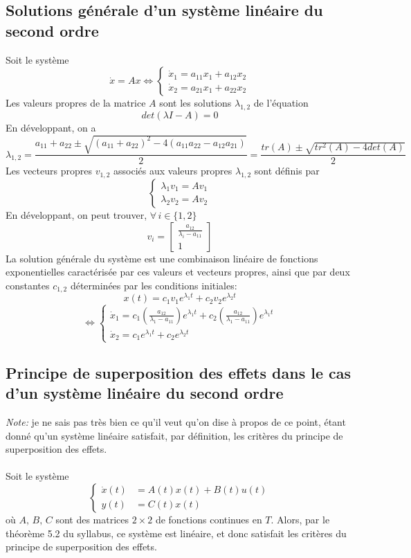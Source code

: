 \documentclass[a4paper]{article}
\begin{document}
\subsection{Solutions générale d'un système linéaire du second ordre}
Soit le système
\[\dot x=Ax\Leftrightarrow
	\begin{cases}
		\dot x_1 = a_{11}x_1 + a_{12}x_2\\
		\dot x_2 = a_{21}x_1 + a_{22}x_2
	\end{cases}
\]
Les valeurs propres de la matrice \(A\) sont les solutions \(\lambda_{1,2}\) de l'équation
\[det(\lambda I-A)=0\]
En développant, on a
\[\lambda_{1,2} = \frac{a_{11}+a_{22} \pm \sqrt{(a_{11}+a_{22})^2 - 4(a_{11}a_{22} - a_{12}a_{21})}}{2}
	=\frac{tr(A)\pm\sqrt{tr^2(A) - 4det(A)}}{2}
\]
Les vecteurs propres \(v_{1,2}\) associés aux valeurs propres \(\lambda_{1,2}\) sont définis par
\[\begin{cases}
	\lambda_1 v_1=Av_1\\
	\lambda_2 v_2=Av_2
\end{cases}\]
En développant, on peut trouver, \(\forall\, i\in\{1, 2\}\)
\[v_i=\begin{bmatrix}
	\frac{a_{12}}{\lambda_i - a_{11}}\\
	1
\end{bmatrix}
\]
La solution générale du système est une combinaison linéaire de fonctions
exponentielles caractérisée par ces valeurs et vecteurs propres, ainsi que par
deux constantes \(c_{1,2}\) déterminées par les conditions initiales:
\[x(t)=c_1 v_1 e^{\lambda_1 t} + c_2 v_2 e^{\lambda_2 t}\]
\[\Leftrightarrow
\begin{cases}
	\dot x_1 = c_1 \left( \frac{a_12}{\lambda_1-a_{11}}\right) e^{\lambda_1 t} +
	           c_2 \left( \frac{a_12}{\lambda_1-a_{11}}\right) e^{\lambda_1 t} \\
	\dot x_2 = c_1 e^{\lambda_1 t} + c_2 e^{\lambda_2 t}
\end{cases}
\]

\subsection{Principe de superposition des effets dans le cas d'un système
linéaire du second ordre}
\emph{Note:} je ne sais pas très bien ce qu'il veut qu'on dise à propos de ce
point, étant donné qu'un système linéaire satisfait, par définition, les
critères du principe de superposition des effets.
\paragraph{}
Soit le système
\[
	\begin{cases}
		\dot x(t)&= A(t)x(t) + B(t)u(t)\\
		y(t)&=C(t)x(t)
	\end{cases}
\]
où \(A,\,B,\,C\) sont des matrices \(2\times 2\) de fonctions continues en
\(T\). Alors, par le théorème 5.2 du syllabus, ce système est linéaire, et donc
satisfait les critères du principe de superposition des effets.
\end{document}
